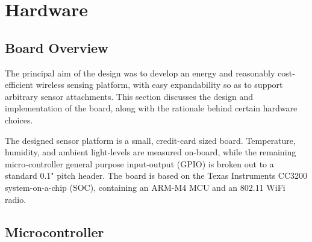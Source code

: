 \chapter{Hardware}

\section{Board Overview}
The principal aim of the design was to develop an energy and reasonably cost-efficient wireless sensing platform, with easy expandability so as to support arbitrary sensor attachments. This section discusses the design and implementation of the board, along with the rationale behind certain hardware choices.

The designed sensor platform is a small, credit-card sized board. Temperature, humidity, and ambient light-levels are measured on-board, while the remaining micro-controller general purpose input-output (GPIO) is broken out to a standard 0.1" pitch header. The board is based on the Texas Instruments CC3200 system-on-a-chip (SOC), containing an ARM-M4 MCU and an 802.11 WiFi radio.

\section{Microcontroller}

\begin{table}[h]
\caption{Microcontroller comparison}
\label{uc-comparison}
\end{table}


